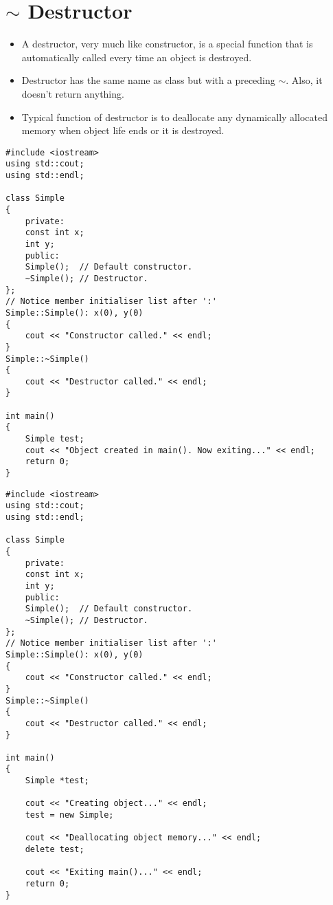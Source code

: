 \documentclass[12pt,a4paper]{article}
\begin{document}
\section{$\sim$ Destructor}
\begin{itemize}
\item A destructor, very much like constructor, is a special function that is automatically called every time an object is destroyed.
\item Destructor has the same name as class but with a preceding $\sim$. Also, it doesn't return anything.
\item Typical function of destructor is to deallocate any dynamically allocated memory when object life ends or it is destroyed.
\end{itemize}
\begin{lstlisting}[caption={Constructor and Destructor}]
#include <iostream>
using std::cout;
using std::endl;

class Simple
{
	private:
	const int x;
	int y;
	public:
	Simple();  // Default constructor.
	~Simple(); // Destructor.
};
// Notice member initialiser list after ':'
Simple::Simple(): x(0), y(0)
{
	cout << "Constructor called." << endl;
}
Simple::~Simple()
{
	cout << "Destructor called." << endl;
}

int main()
{
	Simple test;
	cout << "Object created in main(). Now exiting..." << endl;
	return 0;
}
\end{lstlisting}
\begin{lstlisting}[caption={Constructor and Destructor With Dynamic Allocation}]
#include <iostream>
using std::cout;
using std::endl;

class Simple
{
	private:
	const int x;
	int y;
	public:
	Simple();  // Default constructor.
	~Simple(); // Destructor.
};
// Notice member initialiser list after ':'
Simple::Simple(): x(0), y(0)
{
	cout << "Constructor called." << endl;
}
Simple::~Simple()
{
	cout << "Destructor called." << endl;
}

int main()
{
	Simple *test;
	
	cout << "Creating object..." << endl;
	test = new Simple;
	
	cout << "Deallocating object memory..." << endl;
	delete test;
	
	cout << "Exiting main()..." << endl;
	return 0;
}
\end{lstlisting}
\end{document}
